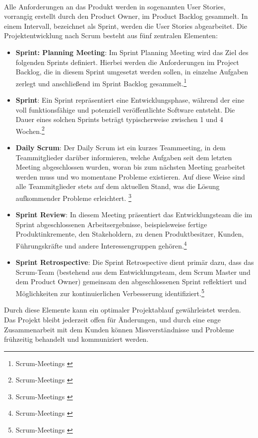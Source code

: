 \\
Alle Anforderungen an das Produkt werden in sogenannten User Stories, vorrangig erstellt durch den Product
Owner, im Product Backlog gesammelt. In einem Intervall, bezeichnet als Sprint, werden die User Stories abgearbeitet.
Die Projektentwicklung nach Scrum besteht aus fünf zentralen Elementen:
\begin{itemize}
    \item \textbf{Sprint: Planning Meeting}: Im Sprint Planning
    Meeting wird das Ziel des folgenden Sprints definiert. Hierbei werden die Anforderungen im Project Backlog, die in
    diesem Sprint umgesetzt werden sollen, in einzelne Aufgaben zerlegt und anschließend im Sprint Backlog gesammelt.\footnote{Scrum-Meetings \cite{Sprint-planing-meeting}}
    \item \textbf{Sprint}: Ein Sprint repräsentiert eine Entwicklungsphase,
    während der eine voll funktionsfähige und potenziell veröffentlichte Software entsteht. Die Dauer eines solchen
    Sprints beträgt typischerweise zwischen 1 und 4 Wochen.\footnote{Scrum-Meetings \cite{Sprint}}
    \item \textbf{Daily Scrum}: Der Daily Scrum ist ein kurzes Teammeeting,
    in dem Teammitglieder darüber informieren, welche Aufgaben seit dem letzten Meeting abgeschlossen wurden, woran bis
    zum nächsten Meeting gearbeitet werden muss und wo momentane Probleme existieren. Auf diese Weise sind alle Teammitglieder
    stets auf dem aktuellen Stand, was die Lösung aufkommender Probleme erleichtert. \footnote{Scrum-Meetings \cite{Daily-Scrum}}
    \item \textbf{Sprint Review}: In diesem Meeting präsentiert das
    Entwicklungsteam die im Sprint abgeschlossenen Arbeitsergebnisse, beispielsweise fertige Produktinkremente, den
    Stakeholdern, zu denen Produktbesitzer, Kunden, Führungskräfte und andere Interessengruppen gehören.\footnote{Scrum-Meetings \cite{Sprint-Review}}
    \item \textbf{Sprint Retrospective}: Die Sprint Retrospective
    dient primär dazu, dass das Scrum-Team (bestehend aus dem Entwicklungsteam, dem Scrum Master und dem Product Owner)
    gemeinsam den abgeschlossenen Sprint reflektiert und Möglichkeiten zur kontinuierlichen Verbesserung identifiziert.\footnote{Scrum-Meetings \cite{Sprint-Retroperspektiv}}
\end{itemize}

Durch diese Elemente kann ein optimaler Projektablauf gewährleistet werden. Das Projekt bleibt jederzeit
offen für Änderungen, und durch eine enge Zusammenarbeit mit dem Kunden können Missverständnisse und Probleme
frühzeitig behandelt und kommuniziert werden.

